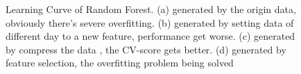 \documentclass[conference]{IEEEtran}
\begin{document}
\begin{figure}[!htb]
  \centering
{}
\hfill
{}
\caption{Learning Curve of Random Forest. (a) generated by the origin data, obviously there's severe overfitting. (b) generated by setting data of different day to a new feature, performance get worse. (c) generated by compress the data , the CV-score gets better. (d) generated by feature selection, the overfitting problem being solved}
\end{figure}
\end{document}
